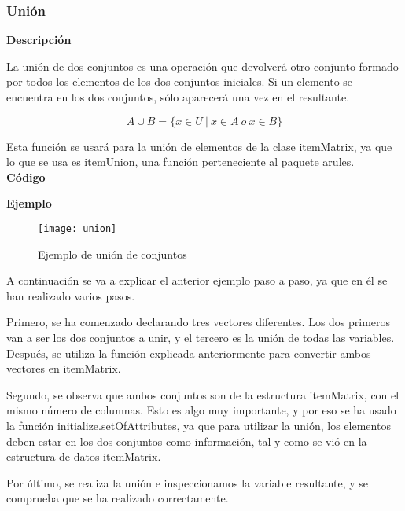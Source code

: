 \subsubsection{Uni\'on}

    \textbf{Descripci\'on}

    La uni\'on de dos conjuntos es una operaci\'on que devolver\'a otro conjunto formado por 
    todos los elementos de los dos conjuntos iniciales. Si un elemento se encuentra en los dos 
    conjuntos, s\'olo aparecer\'a una vez en el resultante.

    \[
    A \cup B = \{x\in U ~ | ~ x\in A ~ o ~ x\in B \}
    \]

    Esta funci\'on se usar\'a para la uni\'on de elementos de la clase itemMatrix, ya que lo que 
    se usa es itemUnion, una funci\'on perteneciente al paquete arules.
    \\


    \textbf{C\'odigo}

    
    \clearpage

    \textbf{Ejemplo}

    \begin{figure}[H]
        \centering
        \texttt{[image: union]}
        \caption{Ejemplo de uni\'on de conjuntos}
        \label{fig:union}
    \end{figure}

    A continuaci\'on se va a explicar el anterior ejemplo paso a paso, ya que en \'el se han realizado varios pasos.

    Primero, se ha comenzado declarando tres vectores diferentes. Los dos primeros van a ser los dos conjuntos a unir, y el 
    tercero es la uni\'on de todas las variables. Despu\'es, se utiliza la funci\'on explicada anteriormente para convertir ambos 
    vectores en itemMatrix.

    Segundo, se observa que ambos conjuntos son de la estructura itemMatrix, con el mismo n\'umero de columnas. Esto es algo muy 
    importante, y por eso se ha usado la funci\'on initialize.setOfAttributes, ya que para utilizar la uni\'on, los elementos deben 
    estar en los dos conjuntos como informaci\'on, tal y como se vi\'o en la estructura de datos itemMatrix.

    Por \'ultimo, se realiza la uni\'on e inspeccionamos la variable resultante, y se comprueba que se ha realizado correctamente.



